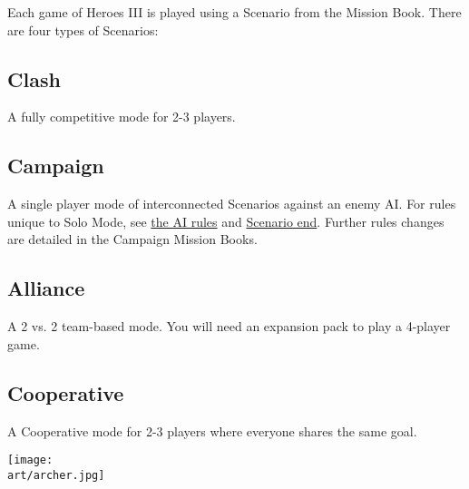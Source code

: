 
\begin{multicols*}{2}

Each game of Heroes III is played using a Scenario from the Mission Book.
There are four types of Scenarios:

\subsection*{Clash}
A fully competitive mode for 2-3 players.

\subsection*{Campaign}
A single player mode of interconnected Scenarios against an enemy AI.
For rules unique to Solo Mode, see \hyperlink{AIrules}{the AI rules} and \hyperlink{End}{Scenario end}.
Further rules changes are detailed in the Campaign Mission Books.

\subsection*{Alliance}
A 2 vs. 2 team-based mode.
You will need an expansion pack to play a 4-player game.

\subsection*{Cooperative}
A Cooperative mode for 2-3 players where everyone shares the same goal.

\vspace*{\fill}

\columnbreak

\texttt{[image: \\art/archer.jpg]}

\end{multicols*}

